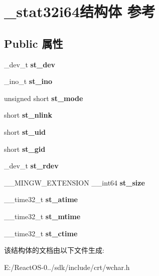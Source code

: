 \hypertarget{struct__stat32i64}{}\section{\+\_\+stat32i64结构体 参考}
\label{struct__stat32i64}
\subsection*{Public 属性}
\begin{DoxyCompactItemize}
\item 
\mbox{\label{struct__stat32i64_a8f72cc361e6b8a7b1094ad1125f4528e}} 
\+\_\+dev\+\_\+t {\bfseries st\+\_\+dev}
\item 
\mbox{\label{struct__stat32i64_a3e2e7fbf657c29640e8b35f59d34cb67}} 
\+\_\+ino\+\_\+t {\bfseries st\+\_\+ino}
\item 
\mbox{\label{struct__stat32i64_a57003a40e479143457b456c95caad8c5}} 
unsigned short {\bfseries st\+\_\+mode}
\item 
\mbox{\label{struct__stat32i64_a711de283d1735aaf356acc847e88e8ef}} 
short {\bfseries st\+\_\+nlink}
\item 
\mbox{\label{struct__stat32i64_a0210db4cb0a08bcabd827c352636f381}} 
short {\bfseries st\+\_\+uid}
\item 
\mbox{\label{struct__stat32i64_a760981698d7a1f482d2b52d4b1546d78}} 
short {\bfseries st\+\_\+gid}
\item 
\mbox{\label{struct__stat32i64_a4e69fc6c703a947e618507562b30b1dc}} 
\+\_\+dev\+\_\+t {\bfseries st\+\_\+rdev}
\item 
\mbox{\label{struct__stat32i64_a52e5e690c46535c19a738a1041da7284}} 
\+\_\+\+\_\+\+M\+I\+N\+G\+W\+\_\+\+E\+X\+T\+E\+N\+S\+I\+ON \+\_\+\+\_\+int64 {\bfseries st\+\_\+size}
\item 
\mbox{\label{struct__stat32i64_ac6fb604c2f3ba454e4b2d5aa4cba7d8d}} 
\+\_\+\+\_\+time32\+\_\+t {\bfseries st\+\_\+atime}
\item 
\mbox{\label{struct__stat32i64_ad784f6702210e6de1e68e25b9b3d2df2}} 
\+\_\+\+\_\+time32\+\_\+t {\bfseries st\+\_\+mtime}
\item 
\mbox{\label{struct__stat32i64_abc7ed840aa22bee2d3072b68f342212c}} 
\+\_\+\+\_\+time32\+\_\+t {\bfseries st\+\_\+ctime}
\end{DoxyCompactItemize}


该结构体的文档由以下文件生成\+:\begin{DoxyCompactItemize}
\item 
E\+:/\+React\+O\+S-\/0../sdk/include/crt/wchar.\+h\end{DoxyCompactItemize}

